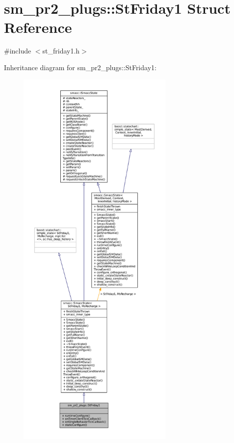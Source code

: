 \hypertarget{structsm__pr2__plugs_1_1StFriday1}{}\section{sm\+\_\+pr2\+\_\+plugs\+:\+:St\+Friday1 Struct Reference}
\label{structsm__pr2__plugs_1_1StFriday1}


{\ttfamily \#include $<$st\+\_\+friday1.\+h$>$}



Inheritance diagram for sm\+\_\+pr2\+\_\+plugs\+:\+:St\+Friday1\+:
\nopagebreak
\begin{figure}[H]
\begin{center}
\leavevmode
\includegraphics[height=550pt]{structsm__pr2__plugs_1_1StFriday1__inherit__graph}
\end{center}
\end{figure}


